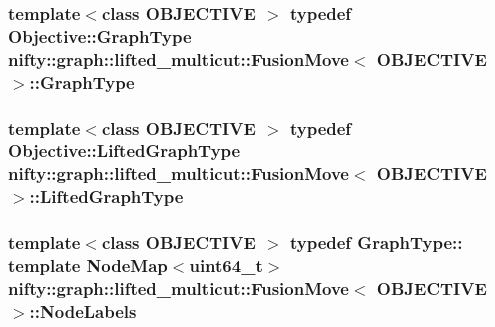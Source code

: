 \subsubsection[{Graph\+Type}]{\setlength{\rightskip}{0pt plus 5cm}template$<$class O\+B\+J\+E\+C\+T\+I\+V\+E $>$ typedef Objective\+::\+Graph\+Type {\bf nifty\+::graph\+::lifted\+\_\+multicut\+::\+Fusion\+Move}$<$ O\+B\+J\+E\+C\+T\+I\+V\+E $>$\+::{\bf Graph\+Type}}\label{classnifty_1_1graph_1_1lifted__multicut_1_1FusionMove_afe918cca306f3d00480c7908da070281}
\hypertarget{classnifty_1_1graph_1_1lifted__multicut_1_1FusionMove_a4e1aa5954b9192884548f95a84ad6ef8}{}
\subsubsection[{Lifted\+Graph\+Type}]{\setlength{\rightskip}{0pt plus 5cm}template$<$class O\+B\+J\+E\+C\+T\+I\+V\+E $>$ typedef Objective\+::\+Lifted\+Graph\+Type {\bf nifty\+::graph\+::lifted\+\_\+multicut\+::\+Fusion\+Move}$<$ O\+B\+J\+E\+C\+T\+I\+V\+E $>$\+::{\bf Lifted\+Graph\+Type}}\label{classnifty_1_1graph_1_1lifted__multicut_1_1FusionMove_a4e1aa5954b9192884548f95a84ad6ef8}
\hypertarget{classnifty_1_1graph_1_1lifted__multicut_1_1FusionMove_a8f1a83b6d5d475f4d430fe12aa15b852}{}
\subsubsection[{Node\+Labels}]{\setlength{\rightskip}{0pt plus 5cm}template$<$class O\+B\+J\+E\+C\+T\+I\+V\+E $>$ typedef Graph\+Type\+:: template Node\+Map$<$uint64\+\_\+t$>$ {\bf nifty\+::graph\+::lifted\+\_\+multicut\+::\+Fusion\+Move}$<$ O\+B\+J\+E\+C\+T\+I\+V\+E $>$\+::{\bf Node\+Labels}}\label{classnifty_1_1graph_1_1lifted__multicut_1_1FusionMove_a8f1a83b6d5d475f4d430fe12aa15b852}
\hypertarget{classnifty_1_1graph_1_1lifted__multicut_1_1FusionMove_a8a17b97a0a28823e4a4c37f79337b2a0}{}
